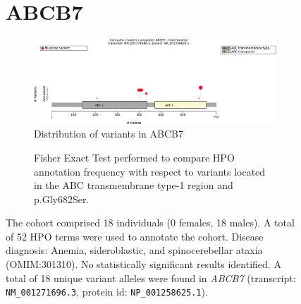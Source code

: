 \begin{figure}[htbp]
\section*{ABCB7}
\centering
\begin{subfigure}[b]{0.95\textwidth}
\centering
\includegraphics[width=\textwidth]{ img/ABCB7_protein_diagram.pdf} 
\captionsetup{justification=raggedright,singlelinecheck=false}
\caption{Distribution of variants in ABCB7}
\end{subfigure}

\vspace{2em}

\begin{subfigure}[b]{0.95\textwidth}
\centering
{}
\captionsetup{justification=raggedright,singlelinecheck=false}
\caption{Fisher Exact Test performed to compare HPO annotation frequency with respect to variants located in the
ABC transmembrane type-1 region and p.Gly682Ser.}
\end{subfigure}

\vspace{2em}

\caption{ The cohort comprised 18 individuals (0 females, 18 males). A total of 52 HPO terms were used to annotate the cohort. Disease diagnosis: Anemia, sideroblastic, and spinocerebellar ataxia (OMIM:301310). No statistically significant results identified. A total of 18 unique variant alleles were found in \textit{ABCB7} (transcript: \texttt{NM\_001271696.3}, protein id: \texttt{NP\_001258625.1}).}
\end{figure}
